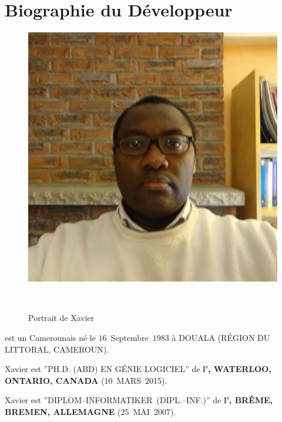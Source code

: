 \vspace{-1.1em}
\section{Biographie du D\'eveloppeur}\label{chap:biography}
\vspace{-0.9em}
\begin{figure}[!htpb]
\centering
\includegraphics[scale=0.35]{../images/XavierNOUNDOU-2}
\caption{Portrait de Xavier}~\label{fig:xaviernoumbis}
\end{figure}

\textbf{\myfullacademicname} est un Camerounais
n\'e le $16$~Septembre~$1983$ \`a DOUALA (R\'EGION DU LITTORAL, CAMEROUN).

Xavier est ''PH.D. (ABD) EN G\'ENIE LOGICIEL'' de
\textbf{l'\uwaterloo, WATERLOO, ONTARIO, CANADA}
($10$~MARS~2015).

Xavier est ''DIPLOM--INFORMATIKER~(DIPL.--INF.)'' de
\textbf{l'\bremenu, BR\^EME, BREMEN, ALLEMAGNE}
($25$~MAI~2007).